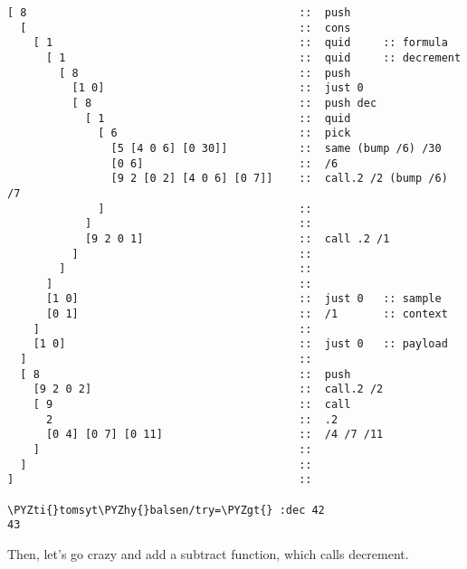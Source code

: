 \begin{framed_shaded}
\begin{Verbatim}[fontsize=\relsize{-2.5},commandchars=\\\{\}]
[ 8                                          ::  push
  [                                          ::  cons
    [ 1                                      ::  quid     :: formula
      [ 1                                    ::  quid     :: decrement
        [ 8                                  ::  push
          [1 0]                              ::  just 0
          [ 8                                ::  push dec
            [ 1                              ::  quid
              [ 6                            ::  pick
                [5 [4 0 6] [0 30]]           ::  same (bump /6) /30
                [0 6]                        ::  /6
                [9 2 [0 2] [4 0 6] [0 7]]    ::  call.2 /2 (bump /6) /7
              ]                              ::
            ]                                :: 
            [9 2 0 1]                        ::  call .2 /1
          ]                                  ::
        ]                                    ::
      ]                                      ::
      [1 0]                                  ::  just 0   :: sample
      [0 1]                                  ::  /1       :: context
    ]                                        ::
    [1 0]                                    ::  just 0   :: payload
  ]                                          ::
  [ 8                                        ::  push
    [9 2 0 2]                                ::  call.2 /2
    [ 9                                      ::  call
      2                                      ::  .2
      [0 4] [0 7] [0 11]                     ::  /4 /7 /11
    ]                                        ::
  ]                                          ::
]                                            ::
                  
\PYZti{}tomsyt\PYZhy{}balsen/try=\PYZgt{} :dec 42
43
\end{Verbatim}
\end{framed_shaded}
Then, let's go crazy and add a subtract function, which calls
decrement.

